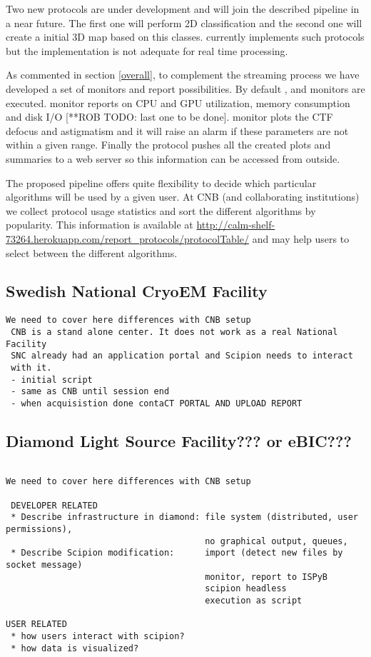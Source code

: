 Two new protocols are under development and will join the described  pipeline in a near future. The first one will perform 2D classification and the second one will create a initial 3D map based on this classes. \scipion currently implements such protocols but the implementation is not adequate for real time processing.

As commented in section \ref{overall}, to complement the streaming process we have developed a set of monitors and report possibilities. By default ,  and  monitors are executed.  monitor reports on  CPU and GPU utilization, memory consumption and disk I/O [**ROB TODO: last one to be done].  monitor plots the CTF defocus and astigmatism  and it will raise an alarm if these parameters are not within a given range. Finally the  protocol pushes all the created plots and summaries to a web server 
so this information can be accessed from outside.

The proposed pipeline offers quite flexibility to decide which particular algorithms will be used by a given user. At CNB (and collaborating institutions) we collect protocol usage statistics and sort the different algorithms by popularity.  This information is available at  \url{http://calm-shelf-73264.herokuapp.com/report_protocols/protocolTable/} and may help users to select   between the different algorithms.

\subsection{Swedish National CryoEM Facility}

\begin{verbatim}
We need to cover here differences with CNB setup
 CNB is a stand alone center. It does not work as a real National Facility
 SNC already had an application portal and Scipion needs to interact
 with it. 
 - initial script
 - same as CNB until session end
 - when acquisistion done contaCT PORTAL AND UPLOAD REPORT
\end{verbatim}

\subsection{Diamond Light Source Facility??? or eBIC???}

\begin{verbatim}
 
We need to cover here differences with CNB setup

 DEVELOPER RELATED
 * Describe infrastructure in diamond: file system (distributed, user permissions),
                                       no graphical output, queues, 
 * Describe Scipion modification:      import (detect new files by socket message)
                                       monitor, report to ISPyB 
                                       scipion headless
                                       execution as script

USER RELATED
 * how users interact with scipion?
 * how data is visualized?
\end{verbatim}

